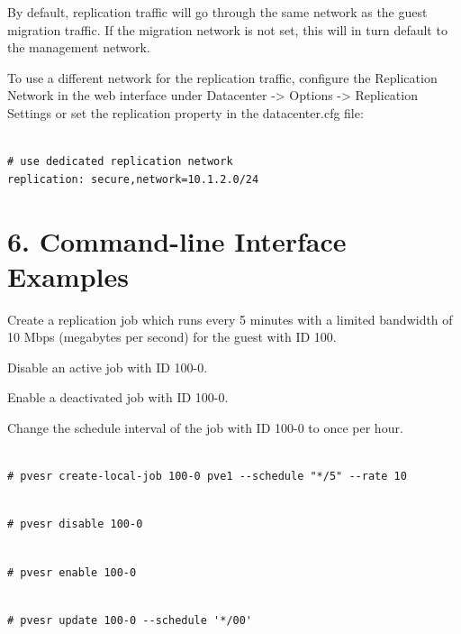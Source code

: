 By default, replication traffic will go through the same network as the guest migration traffic. If the migration network is not set, this will in turn default to the management network.

To use a different network for the replication traffic, configure the Replication Network in the web interface under Datacenter -> Options -> Replication Settings or set the replication property in the datacenter.cfg file:

\begin{lstlisting}

# use dedicated replication network
replication: secure,network=10.1.2.0/24

\end{lstlisting}


\section{6. Command-line Interface Examples}

Create a replication job which runs every 5 minutes with a limited bandwidth of 10 Mbps (megabytes per second) for the guest with ID 100.

Disable an active job with ID 100-0.

Enable a deactivated job with ID 100-0.

Change the schedule interval of the job with ID 100-0 to once per hour.

\begin{lstlisting}

# pvesr create-local-job 100-0 pve1 --schedule "*/5" --rate 10

\end{lstlisting}

\begin{lstlisting}

# pvesr disable 100-0

\end{lstlisting}

\begin{lstlisting}

# pvesr enable 100-0

\end{lstlisting}

\begin{lstlisting}

# pvesr update 100-0 --schedule '*/00'

\end{lstlisting}


